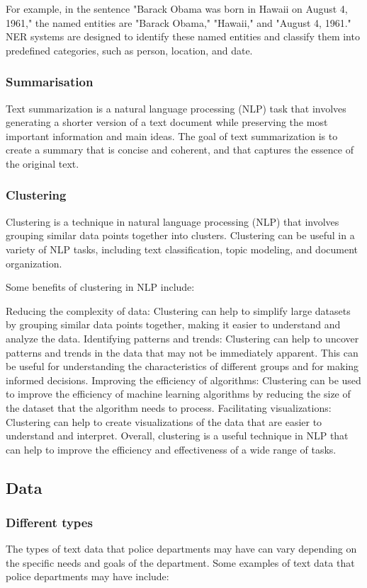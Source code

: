 For example, in the sentence "Barack Obama was born in Hawaii on August 4, 1961," the named entities are "Barack Obama," "Hawaii," and "August 4, 1961." NER systems are designed to identify these named entities and classify them into predefined categories, such as person, location, and date.

\subsubsection{Summarisation} Text summarization is a natural language processing (NLP) task that involves generating a shorter version of a text document while preserving the most important information and main ideas. The goal of text summarization is to create a summary that is concise and coherent, and that captures the essence of the original text.

\subsubsection{Clustering} Clustering is a technique in natural language processing (NLP) that involves grouping similar data points together into clusters. Clustering can be useful in a variety of NLP tasks, including text classification, topic modeling, and document organization.

Some benefits of clustering in NLP include:

Reducing the complexity of data: Clustering can help to simplify large datasets by grouping similar data points together, making it easier to understand and analyze the data.
Identifying patterns and trends: Clustering can help to uncover patterns and trends in the data that may not be immediately apparent. This can be useful for understanding the characteristics of different groups and for making informed decisions.
Improving the efficiency of algorithms: Clustering can be used to improve the efficiency of machine learning algorithms by reducing the size of the dataset that the algorithm needs to process.
Facilitating visualizations: Clustering can help to create visualizations of the data that are easier to understand and interpret.
Overall, clustering is a useful technique in NLP that can help to improve the efficiency and effectiveness of a wide range of tasks.


\subsection{Data}
\subsubsection{Different types} The types of text data that police departments may have can vary depending on the specific needs and goals of the department. Some examples of text data that police departments may have include:

